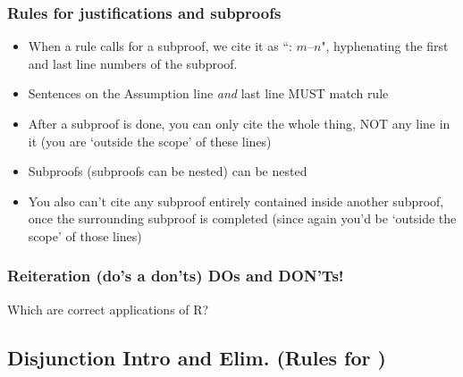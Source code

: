 \begin{frame}
  \frametitle{Rules for justifications and subproofs}

  \begin{itemize}[<+->]
    \item When a rule calls for a subproof, we cite it as ``: $m$--$n$",
   hyphenating the first and last line numbers of the subproof.
    \item Sentences on the Assumption line \emph{and} last line MUST match rule
    \item After a subproof is done, you can only cite the whole thing,
    NOT any line in it (you are `outside the scope' of these lines)
    \item Subproofs \footnotesize{(subproofs can be nested)} \normalsize{can be nested}
    \item You also can't cite any subproof entirely
    contained inside another subproof, once the surrounding subproof
    is completed (since again you'd be `outside the scope' of those lines)
  \end{itemize}
\end{frame}

\begin{frame}
  \frametitle{Reiteration (do's a don'ts) DOs and DON'Ts!}
Which are correct applications of R?
  \begin{fitchproof}
    \open
     \as{}
    \open
     \as{}
     
    \close
     
     
    \close
     
     
  \end{fitchproof}
\end{frame}

\subsection{Disjunction Intro and Elim. (Rules for \eor)}

